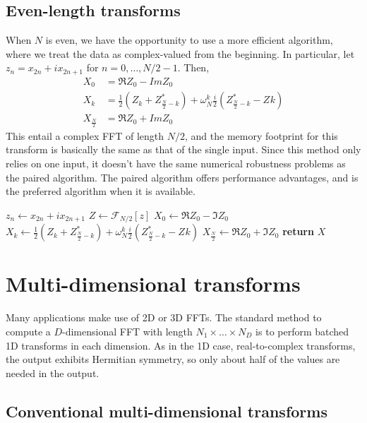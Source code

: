 \documentclass[12pt]{article}
\newcommand{\Four}{\mathcal{F}}
\begin{document}
\subsection{Even-length transforms}

When $N$ is even, we have the opportunity to use a more efficient
algorithm, where we treat the data as complex-valued from the
beginning.  In particular, let $z_n = x_{2n} + i x_{2n+1}$ for
$n=0,\dots,N/2-1$.  Then,
\begin{align}
  X_0 &= \Re{Z_0} - Im{Z_0}\\
  X_k &= \frac{1}{2} \left(Z_k + Z_{\frac{N}{2}-k}^*\right)
  + \omega_N^k \frac{i}{2} \left(Z_{\frac{N}{2}-k}^* - Z_{}k\right) \\
  X_{\frac{N}{2}} &=  \Re{Z_0} + Im{Z_0}
\end{align}
This entail a complex FFT of length $N/2$, and the memory footprint
for this transform is basically the same as that of the single input.
Since this method only relies on one input, it doesn't have the same
numerical robustness problems as the paired algorithm. The paired
algorithm offers performance advantages, and is the preferred
algorithm when it is available.
\begin{algorithm}
  \caption{Even algorithm}\label{even}
  \begin{algorithmic}[1]
    \State $z_n \gets x_{2n} + i x_{2n+1}$
    \EndFor
    \State $Z \gets \Four_{N/2}\left[z\right]$
    \State $X_0 \gets \Re{Z_0} - \Im{Z_0}$ 
    \State $X_k \gets \frac{1}{2} \left(Z_k + Z_{\frac{N}{2}-k}^*\right)
  + \omega_N^k \frac{i}{2} \left(Z_{\frac{N}{2}-k}^* - Z_{}k\right)$
    \EndFor
    \State $X_{\frac{N}{2}} \gets \Re{Z_0} + \Im{Z_0}$ 
    \State \textbf{return} $X$
  \end{algorithmic}
\end{algorithm}


\section{Multi-dimensional transforms}

Many applications make use of 2D or 3D FFTs.  The standard method to
compute a $D$-dimensional FFT with length
$N_1\times{}\dots{}\times{}N_D$ is to perform batched 1D transforms in
each dimension.  As in the 1D case, real-to-complex transforms, the
output exhibits Hermitian symmetry, so only about half of the values
are needed in the output.

\subsection{Conventional multi-dimensional transforms}
\end{document}
